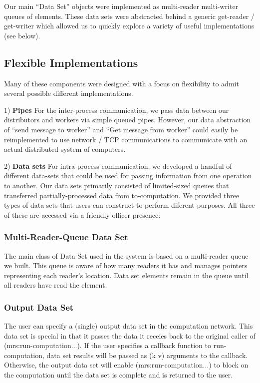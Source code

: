 \documentclass{article}
\begin{document}
Our main ``Data Set'' objects were implemented as multi-reader
multi-writer queues of elements. These data sets were abstracted
behind a generic get-reader / get-writer which allowed us to quickly
explore a variety of useful implementations (see below).

\subsection{Flexible Implementations}

Many of these components were designed with a focus on flexibility to
admit several possible different implementations.

1) {\bf Pipes} For the inter-process communication, we pass data between our
distributors and workers via simple queued pipes. However, our data
abstraction of ``send message to worker'' and ``Get message from
worker'' could easily be reimplemented to use network / TCP
communications to communicate with an actual distributed system of computers.

2) {\bf Data sets} For intra-process communication, we developed a handful of
different data-sets that could be used for passing information from
one operation to another. Our data sets primarily consisted of
limited-sized queues that transferred partially-processed data from
to-computation. We provided three types of data-sets that users can
construct to perform diferent purposes. All three of these are
accessed via a friendly officer presence:

\subsubsection{Multi-Reader-Queue Data Set}
The main class of Data Set used in the system is based on a
multi-reader queue we built. This queue is aware of how many readers
it has and manages pointers representing each reader's location. Data
set elements remain in the queue until all readers have read the
element. 

\subsubsection{Output Data Set}
The user can specify a (single) output data set in the computation
network. This data set is special in that it passes the data it
receies back to the original caller of (mrs:run-computation...). If
the user specifies a callback function to run-computation, data set
results will be passed as (k v) arguments to the callback. Otherwise,
the output data set will enable (mrs:run-computation...) to block on
the computation until the data set is complete and is returned to the user.
\end{document}
